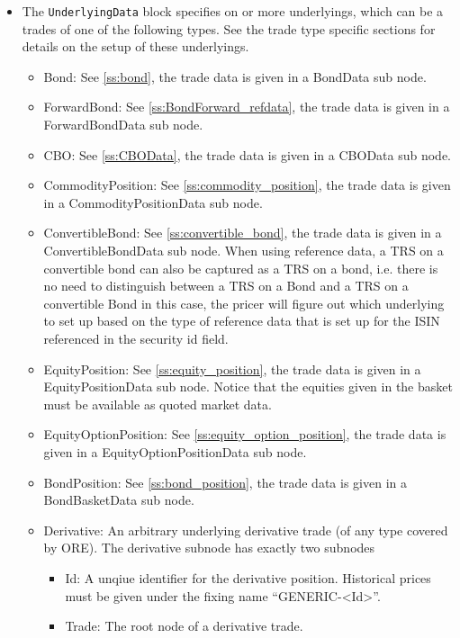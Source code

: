 \begin{itemize}
\item The {\tt UnderlyingData} block specifies on or more underlyings, which can be a trades of one of the following
  types. See the trade type specific sections for details on the setup of these underlyings.
  \begin{itemize}
  \item Bond: See \ref{ss:bond}, the trade data is given in a BondData sub node.
  \item ForwardBond: See \ref{ss:BondForward_refdata}, the trade data is given in a ForwardBondData sub node.
  \item CBO: See \ref{ss:CBOData}, the trade data is given in a CBOData sub node.
  \item CommodityPosition: See \ref{ss:commodity_position}, the trade data is given in a CommodityPositionData sub node.
  \item ConvertibleBond: See \ref{ss:convertible_bond}, the trade data is given in a ConvertibleBondData sub
    node. When using reference data, a TRS on a convertible bond can also be captured as a TRS on a bond, i.e. there is
    no need to distinguish between a TRS on a Bond and a TRS on a convertible Bond in this case, the pricer will figure
    out which underlying to set up based on the type of reference data that is set up for the ISIN referenced in the
    security id field.
  \item EquityPosition: See \ref{ss:equity_position}, the trade data is given in a EquityPositionData sub
    node. Notice that the equities given in the basket must be available as quoted market data.
  \item EquityOptionPosition: See \ref{ss:equity_option_position}, the trade data is given in a EquityOptionPositionData
    sub node.
  \item BondPosition: See \ref{ss:bond_position}, the trade data is given in a BondBasketData sub node.
  \item Derivative: An arbitrary underlying derivative trade (of any type covered by ORE). The derivative subnode has
    exactly two subnodes
    \begin{itemize}
      \item Id: A unqiue identifier for the derivative position. Historical prices must be given under the fixing name
        ``GENERIC-<Id>''.
      \item Trade: The root node of a derivative trade.
    \end{itemize}


\end{itemize}
\end{itemize}
